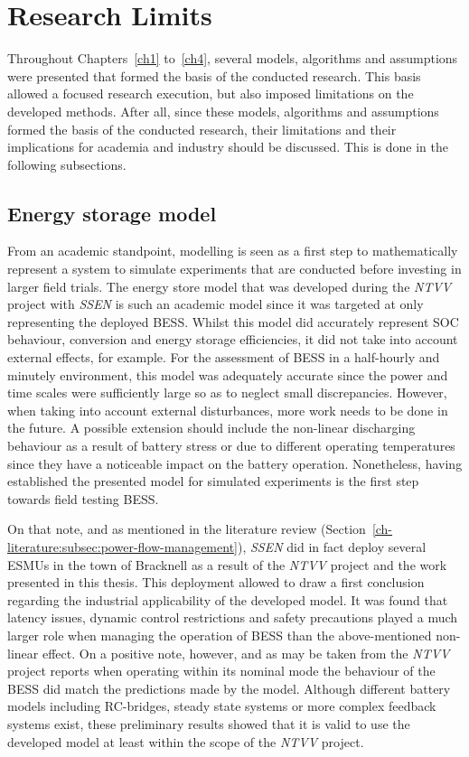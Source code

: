 \section{Research Limits}
\label{ch-conclusions:sec:research-limits}

Throughout Chapters~\ref{ch1} to~\ref{ch4}, several models, algorithms and assumptions were presented that formed the basis of the conducted research.
This basis allowed a focused research execution, but also imposed limitations on the developed methods.
After all, since these models, algorithms and assumptions formed the basis of the conducted research, their limitations and their implications for academia and industry should be discussed.
This is done in the following subsections.

\subsection{Energy storage model}

From an academic standpoint, modelling is seen as a first step to mathematically represent a system to simulate experiments that are conducted before investing in larger field trials.
The energy store model that was developed during the \textit{NTVV} project with \textit{SSEN} is such an academic model since it was targeted at only representing the deployed BESS.
Whilst this model did accurately represent SOC behaviour, conversion and energy storage efficiencies, it did not take into account external effects, for example.
For the assessment of BESS in a half-hourly and minutely environment, this model was adequately accurate since the power and time scales were sufficiently large so as to neglect small discrepancies.
However, when taking into account external disturbances, more work needs to be done in the future.
A possible extension should include the non-linear discharging behaviour as a result of battery stress or due to different operating temperatures since they have a noticeable impact on the battery operation.
Nonetheless, having established the presented model for simulated experiments is the first step towards field testing BESS.

On that note, and as mentioned in the literature review (Section~\ref{ch-literature:subsec:power-flow-management}), \textit{SSEN} did in fact deploy several ESMUs in the town of Bracknell as a result of the \textit{NTVV} project and the work presented in this thesis.
This deployment allowed to draw a first conclusion regarding the industrial applicability of the developed model.
It was found that latency issues, dynamic control restrictions and safety precautions played a much larger role when managing the operation of BESS than the above-mentioned non-linear effect.
On a positive note, however, and as may be taken from the \textit{NTVV} project reports \cite{NTVV9.8a} when operating within its nominal mode the behaviour of the BESS did match the predictions made by the model.
Although different battery models including RC-bridges, steady state systems or more complex feedback systems exist, these preliminary results showed that it is valid to use the developed model at least within the scope of the \textit{NTVV} project.

